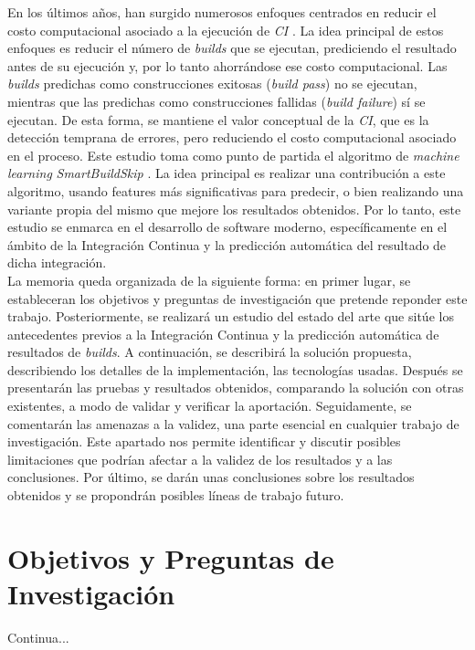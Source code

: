 En los últimos años, han surgido numerosos enfoques centrados en reducir el costo computacional
asociado a la ejecución de \textit{CI} \cite{2,4,5,6,7,8}. La idea principal de estos enfoques es
reducir el número de \textit{builds} que se ejecutan, prediciendo el resultado antes de su
ejecución y, por lo tanto ahorrándose ese costo computacional. Las \textit{builds} predichas como
construcciones exitosas (\textit{build pass}) no se ejecutan, mientras que las predichas como
construcciones fallidas (\textit{build failure}) sí se ejecutan. De esta forma, se mantiene el
valor conceptual de la \textit{CI}, que es la detección temprana de errores, pero reduciendo
el costo computacional asociado en el proceso. Este estudio toma como punto de partida el
algoritmo de \textit{machine learning} \textit{SmartBuildSkip} \cite{2}. La idea principal es
realizar una contribución a este algoritmo, usando features más significativas para predecir, o
bien realizando una variante propia del mismo que mejore los resultados obtenidos. Por lo tanto,
este estudio se enmarca en el desarrollo de software moderno, específicamente en el ámbito de
la Integración Continua y la predicción automática del resultado de dicha integración.\\

La memoria queda organizada de la siguiente forma: en primer lugar, se estableceran los
objetivos y preguntas de investigación que pretende reponder este trabajo. Posteriormente, se
realizará un estudio del estado del arte que sitúe los antecedentes previos a la Integración
Continua y la predicción automática de resultados de \textit{builds}. A continuación, se
describirá la solución propuesta, describiendo los detalles de la implementación, las
tecnologías usadas. Después se presentarán las pruebas y resultados obtenidos, comparando la
solución con otras existentes, a modo de validar y verificar la aportación. Seguidamente, se
comentarán las amenazas a la validez, una parte esencial en cualquier trabajo de investigación.
Este apartado nos permite identificar y discutir posibles limitaciones que podrían afectar a la
validez de los resultados y a las conclusiones. Por último, se darán unas conclusiones sobre los
resultados obtenidos y se propondrán posibles líneas de trabajo futuro.

\section{Objetivos y Preguntas de Investigación}

Continua...
